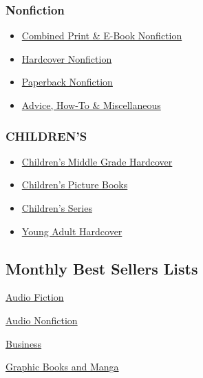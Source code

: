 \hypertarget{nonfiction}{%
\subsubsection{Nonfiction}\label{nonfiction}}

\begin{itemize}
\tightlist
\item
  \href{/books/best-sellers/combined-print-and-e-book-nonfiction/}{Combined
  Print \& E-Book Nonfiction}
\item
  \href{/books/best-sellers/hardcover-nonfiction/}{Hardcover Nonfiction}
\item
  \href{/books/best-sellers/paperback-nonfiction/}{Paperback Nonfiction}
\item
  \href{/books/best-sellers/advice-how-to-and-miscellaneous/}{Advice,
  How-To \& Miscellaneous}
\end{itemize}

\hypertarget{childrens}{%
\subsubsection{CHILDREN'S}\label{childrens}}

\begin{itemize}
\tightlist
\item
  \href{/books/best-sellers/childrens-middle-grade-hardcover/}{Children's
  Middle Grade Hardcover}
\item
  \href{/books/best-sellers/picture-books/}{Children's Picture Books}
\item
  \href{/books/best-sellers/series-books/}{Children's Series}
\item
  \href{/books/best-sellers/young-adult-hardcover/}{Young Adult
  Hardcover}
\end{itemize}

\hypertarget{monthly-best-sellers-lists}{%
\subsection{Monthly Best Sellers
Lists}\label{monthly-best-sellers-lists}}

\href{/books/best-sellers/audio-fiction/}{Audio Fiction}

\href{/books/best-sellers/audio-nonfiction/}{Audio Nonfiction}

\href{/books/best-sellers/business-books/}{Business}

\href{/books/best-sellers/graphic-books-and-manga/}{Graphic Books and
Manga}

